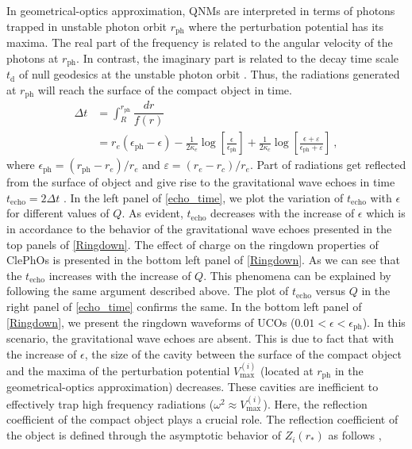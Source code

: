 \documentclass[aps,prd,twocolumn,floatfix,noshowpacs,tightenlines,noshowkeys,superscriptaddress,amsmath,amssymb,
nofootinbib]{revtex4-1}
\renewcommand\[{\begin{equation}}
\renewcommand\]{\end{equation}}
\begin{document}
In geometrical-optics approximation, QNMs are interpreted in terms of photons trapped in unstable photon orbit $r_{\textrm{ph}}$ where the perturbation potential has its maxima. The real part of the frequency is related to the angular velocity of the photons at   $r_{\textrm{ph}}$. In contrast, the imaginary part is related to the decay time scale $t_{\textrm{d}}$ of null geodesics at the unstable photon orbit \cite{Cardoso:2008bp}. Thus, the radiations generated at $r_{\textrm{ph}}$ will reach the surface of the compact object in time. 
\begin{equation}\label{round_trip}
\begin{aligned}
\Delta t &=\int_{R}^{r_{\textrm{ph}}}\dfrac{dr}{f(r)}\\&=r_e(\epsilon_{\textrm{ph}}-\epsilon)-\frac{1}{2\kappa_{e}}\log[\frac{\epsilon}{\epsilon_{\textrm{ph}}}]+\frac{1}{2\kappa_{c}}\log[\frac{\epsilon+\varepsilon}{\epsilon_{\textrm{ph}}+\varepsilon}]~,
\end{aligned}
\end{equation}
where $\epsilon_{\textrm{ph}}=(r_{\textrm{ph}}-r_{e})/r_e$ and $\varepsilon=(r_{e}-r_{c})/r_e$. Part of radiations get reflected from the surface of object and give rise to the gravitational wave echoes  in time $t_{\textrm{echo}}=2\Delta t$ \cite{Abedi:2016hgu,Cardoso:2019rvt,Cardoso:2016oxy}. In the left panel of \autoref{echo_time}, we plot the variation of $t_{\textrm{echo}}$ with $\epsilon$ for different values of $Q$. As evident, $t_{\textrm{echo}}$ decreases with the increase of $\epsilon$ which is in accordance to the behavior of the gravitational wave echoes presented in the top panels of \autoref{Ringdown}. The effect of charge on the ringdown properties of ClePhOs is presented in the bottom left panel of \autoref{Ringdown}. As we can see that the  $t_{\textrm{echo}}$ increases  with the increase of $Q$. This phenomena can be explained by following the same argument described above. The plot of $t_{\textrm{echo}}$ versus $Q$ in the right panel of \autoref{echo_time} confirms the same.  In the bottom left panel of \autoref{Ringdown}, we present the ringdown waveforms of UCOs ($0.01<\epsilon<\epsilon_{\textrm{ph}}$). In this scenario, the gravitational wave echoes are absent. This is due to fact that with the increase of $\epsilon$, the size of the cavity  between the surface of the compact object and the maxima of the perturbation potential $V_{\textrm{max}}^{(i)}$ (located at $r_{\textrm{ph}}$ in the geometrical-optics approximation) decreases. These cavities are inefficient to effectively trap high frequency radiations ($\omega^2\approx V_{\textrm{max}}^{(i)}$). Here, the reflection coefficient of the compact object plays a crucial role. The reflection coefficient of the object is defined through the asymptotic behavior of $Z_{i}(r_*)$ as follows \cite{Maggio:2020jml}, 
\end{document}
